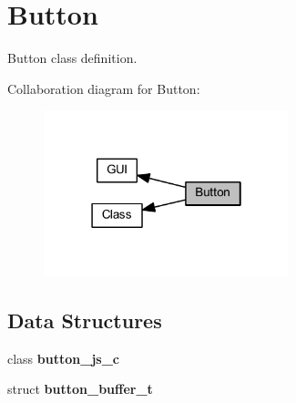 \section{Button}
\label{group___button}


Button class definition.  


Collaboration diagram for Button\+:\nopagebreak
\begin{figure}[H]
\begin{center}
\leavevmode
\includegraphics[width=202pt]{group___button}
\end{center}
\end{figure}
\subsection*{Data Structures}
\begin{DoxyCompactItemize}
\item 
class \textbf{ button\+\_\+js\+\_\+c}
\item 
struct \textbf{ button\+\_\+buffer\+\_\+t}
\end{DoxyCompactItemize}
